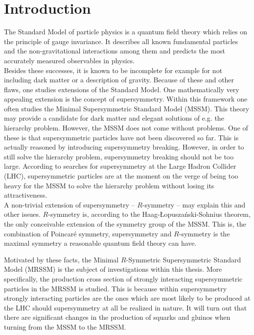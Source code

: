 \section{Introduction}
The Standard Model of particle physics is a quantum field theory which relies on the principle of gauge invariance. It describes all known fundamental particles and the non-gravitational interactions among them and predicts the most accurately measured observables in physics.\\
Besides these successes, it is known to be incomplete for example for not including dark matter or a description of gravity. Because of these and other flaws, one studies extensions of the Standard Model. One mathematically very appealing extension is the concept of supersymmetry. Within this framework one often studies the Minimal Supersymmetric Standard Model (MSSM). This theory may provide a candidate for dark matter and elegant solutions of e.g. the hierarchy problem. However, the MSSM does not come without problems. One of these is that supersymmetric particles have not been discovered so far. This is  actually reasoned by introducing supersymmetry breaking. However, in order to still solve the hierarchy problem, supersymmetry breaking should not be too large. According to searches for supersymmetry at the Large Hadron Collider (LHC), supersymmetric particles are at the moment on the verge of being too heavy for the MSSM to solve the hierarchy problem without losing its attractiveness.\\
A non-trivial extension of supersymmetry -- $R$-symmetry -- may explain this and other issues. $R$-symmetry is, according to the Haag-{\L}opusza\'nski-Sohnius theorem, the only conceivable extension of the symmetry group of the MSSM. This is, the combination of Poincaré symmetry, supersymmetry and $R$-symmetry is the maximal symmetry a reasonable quantum field theory can have.\\
Motivated by these facts, the Minimal $R$-Symmetric Supersymmetric Standard Model (MRSSM) is the subject of investigations within this thesis. More specifically, the production cross section of strongly interacting supersymmetric particles in the MRSSM is studied. This is because within supersymmetry strongly interacting particles are the ones which are most likely to be produced at the LHC should supersymmetry at all be realized in nature. It will turn out that there are significant changes in the production of squarks and gluinos when turning from the MSSM to the MRSSM.\\

